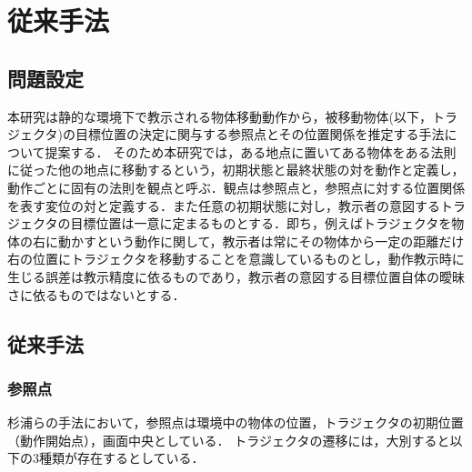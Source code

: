 ﻿%
\chapter{従来手法}

\section{問題設定}

本研究は静的な環境下で教示される物体移動動作から，被移動物体(以下，トラジェクタ)の目標位置の決定に関与する参照点とその位置関係を推定する手法について提案する．
そのため本研究では，ある地点に置いてある物体をある法則に従った他の地点に移動するという，初期状態と最終状態の対を動作と定義し，動作ごとに固有の法則を観点と呼ぶ．観点は参照点と，参照点に対する位置関係を表す変位の対と定義する．また任意の初期状態に対し，教示者の意図するトラジェクタの目標位置は一意に定まるものとする．即ち，例えばトラジェクタを物体の右に動かすという動作に関して，教示者は常にその物体から一定の距離だけ右の位置にトラジェクタを移動することを意識しているものとし，動作教示時に生じる誤差は教示精度に依るものであり，教示者の意図する目標位置自体の曖昧さに依るものではないとする．

\section{従来手法}

\subsection{参照点}

杉浦ら\cite{sugiura}の手法において，参照点は環境中の物体の位置，トラジェクタの初期位置（動作開始点），画面中央としている．
トラジェクタの遷移には，大別すると以下の3種類が存在するとしている．

